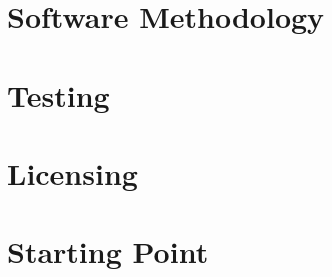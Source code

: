 \section{Software Methodology}


\section{Testing}


\section{Licensing}


\section{Starting Point}

